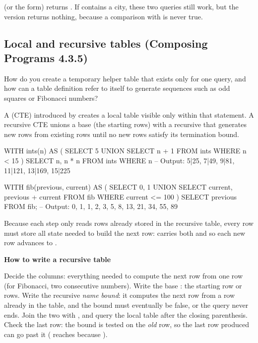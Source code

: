\documentclass[10pt]{scrartcl}
\newenvironment{howto}[1]{\begin{mdframed}[style=howtostyle]{\color{NavyBlue}\textbf{#1}}\par\vspace{2pt}}{\end{mdframed}}
\begin{document}
\revisit {} (or the  form) returns . If  contains a  city, these two queries still work, but the  version returns nothing, because a comparison with  is never true.

\subsection{Local and recursive tables (Composing Programs 4.3.5)}

\begin{qbox}
  How do you create a temporary helper table that exists only for one query, and how can a table definition refer to itself to generate sequences such as odd squares or Fibonacci numbers?
\end{qbox}

A  (CTE) introduced by  creates a local table visible only within that statement. A recursive CTE unions a base  (the starting rows) with a recursive  that generates new rows from existing rows until no new rows satisfy its  termination bound.

\begin{sql}
WITH ints(n) AS (
  SELECT 5 UNION
  SELECT n + 1 FROM ints WHERE n < 15
)
SELECT n, n * n FROM ints WHERE n %
-- Output: 5|25, 7|49, 9|81, 11|121, 13|169, 15|225

WITH fib(previous, current) AS (
  SELECT 0, 1 UNION
  SELECT current, previous + current FROM fib WHERE current <= 100
)
SELECT previous FROM fib;
-- Output: 0, 1, 1, 2, 3, 5, 8, 13, 21, 34, 55, 89
\end{sql}

Because each step only reads rows already stored in the recursive table, every row must store all state needed to build the next row:  carries both  and  so each new row advances to .

\begin{howto}{How to write a recursive  table}
\begin{steps}
  \ii Decide the columns: everything needed to compute the next row from one row (for Fibonacci, two consecutive numbers).
  \ii Write the base : the starting row or rows.
  \ii Write the recursive  \emph{name}  \emph{bound}: it computes the next row from a row already in the table, and the  bound must eventually be false, or the query never ends.
  \ii Join the two with , and query the local table after the closing parenthesis.
  \ii Check the last row: the bound is tested on the \emph{old} row, so the last row produced can go past it ( reaches  because ).
\end{steps}
\end{howto}
\end{document}
